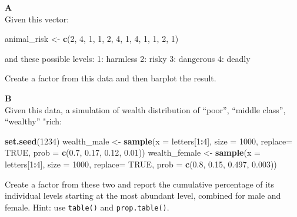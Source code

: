 \documentclass[]{book}
\newenvironment{Shaded}{\begin{snugshade}}{\end{snugshade}}
\newcommand{\DataTypeTok}[1]{\textcolor[rgb]{0.13,0.29,0.53}{#1}}
\newcommand{\DecValTok}[1]{\textcolor[rgb]{0.00,0.00,0.81}{#1}}
\newcommand{\FloatTok}[1]{\textcolor[rgb]{0.00,0.00,0.81}{#1}}
\newcommand{\KeywordTok}[1]{\textcolor[rgb]{0.13,0.29,0.53}{\textbf{#1}}}
\newcommand{\NormalTok}[1]{#1}
\newcommand{\OperatorTok}[1]{\textcolor[rgb]{0.81,0.36,0.00}{\textbf{#1}}}
\newcommand{\OtherTok}[1]{\textcolor[rgb]{0.56,0.35,0.01}{#1}}
\newcommand{\StringTok}[1]{\textcolor[rgb]{0.31,0.60,0.02}{#1}}
\begin{document}
\textbf{A}\\
Given this vector:

\begin{Shaded}
\begin{Highlighting}[]
\NormalTok{animal_risk <-}\StringTok{ }\KeywordTok{c}\NormalTok{(}\DecValTok{2}\NormalTok{, }\DecValTok{4}\NormalTok{, }\DecValTok{1}\NormalTok{, }\DecValTok{1}\NormalTok{, }\DecValTok{2}\NormalTok{, }\DecValTok{4}\NormalTok{, }\DecValTok{1}\NormalTok{, }\DecValTok{4}\NormalTok{, }\DecValTok{1}\NormalTok{, }\DecValTok{1}\NormalTok{, }\DecValTok{2}\NormalTok{, }\DecValTok{1}\NormalTok{)}
\end{Highlighting}
\end{Shaded}

and these possible levels:
1: harmless
2: risky
3: dangerous
4: deadly

Create a factor from this data and then barplot the result.

\textbf{B}\\
Given this data, a simulation of wealth distribution of ``poor'', ``middle class'', ``wealthy'' "rich:

\begin{Shaded}
\begin{Highlighting}[]
\KeywordTok{set.seed}\NormalTok{(}\DecValTok{1234}\NormalTok{)}
\NormalTok{wealth_male <-}\StringTok{ }\KeywordTok{sample}\NormalTok{(}\DataTypeTok{x =}\NormalTok{ letters[}\DecValTok{1}\OperatorTok{:}\DecValTok{4}\NormalTok{], }
                 \DataTypeTok{size =} \DecValTok{1000}\NormalTok{,}
                 \DataTypeTok{replace=} \OtherTok{TRUE}\NormalTok{, }
                 \DataTypeTok{prob =} \KeywordTok{c}\NormalTok{(}\FloatTok{0.7}\NormalTok{, }\FloatTok{0.17}\NormalTok{, }\FloatTok{0.12}\NormalTok{, }\FloatTok{0.01}\NormalTok{))}
\NormalTok{wealth_female <-}\StringTok{ }\KeywordTok{sample}\NormalTok{(}\DataTypeTok{x =}\NormalTok{ letters[}\DecValTok{1}\OperatorTok{:}\DecValTok{4}\NormalTok{], }
                 \DataTypeTok{size =} \DecValTok{1000}\NormalTok{,}
                 \DataTypeTok{replace=} \OtherTok{TRUE}\NormalTok{, }
                 \DataTypeTok{prob =} \KeywordTok{c}\NormalTok{(}\FloatTok{0.8}\NormalTok{, }\FloatTok{0.15}\NormalTok{, }\FloatTok{0.497}\NormalTok{, }\FloatTok{0.003}\NormalTok{))}
\end{Highlighting}
\end{Shaded}

Create a factor from these two and report the cumulative percentage of its individual levels starting at the most abundant level, combined for male and female. Hint: use \texttt{table()} and \texttt{prop.table()}.
\end{document}

